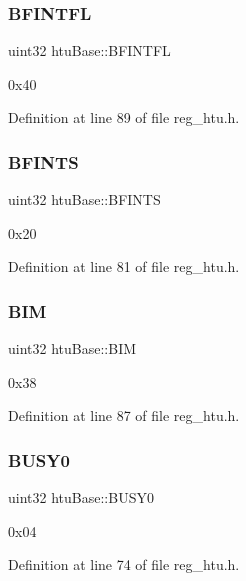 \subsubsection{\texorpdfstring{B\+F\+I\+N\+T\+FL}{BFINTFL}}
{\footnotesize\ttfamily uint32 htu\+Base\+::\+B\+F\+I\+N\+T\+FL}

0x40 

Definition at line 89 of file reg\+\_\+htu.\+h.

\mbox{\label{structhtuBase_a44a6df8c1eef25dfc567c509b06e787d}} 
\subsubsection{\texorpdfstring{B\+F\+I\+N\+TS}{BFINTS}}
{\footnotesize\ttfamily uint32 htu\+Base\+::\+B\+F\+I\+N\+TS}

0x20 

Definition at line 81 of file reg\+\_\+htu.\+h.

\mbox{\label{structhtuBase_a44ac810acccee51955b733a36c592d05}} 
\subsubsection{\texorpdfstring{B\+IM}{BIM}}
{\footnotesize\ttfamily uint32 htu\+Base\+::\+B\+IM}

0x38 

Definition at line 87 of file reg\+\_\+htu.\+h.

\mbox{\label{structhtuBase_adcf411f065196fd7668f4baec3bcbb7c}} 
\subsubsection{\texorpdfstring{B\+U\+S\+Y0}{BUSY0}}
{\footnotesize\ttfamily uint32 htu\+Base\+::\+B\+U\+S\+Y0}

0x04 

Definition at line 74 of file reg\+\_\+htu.\+h.

\mbox{\label{structhtuBase_abf5eecfd69fb2c6e697c5c6c549c84f6}} 
